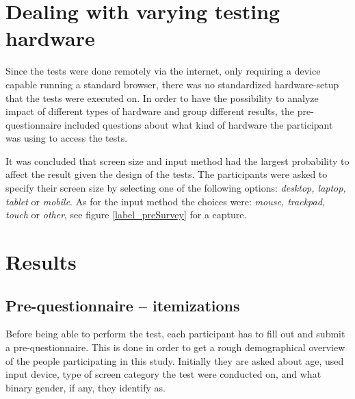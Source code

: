 
\section{Dealing with varying testing hardware}\label{label_testingHardware}

  Since the tests were done remotely via the internet, only requiring a
  device capable running a standard browser, there was no standardized
  hardware-setup that the tests were executed on. In order to have the
  possibility to analyze impact of different types of hardware and group
  different results, the pre-questionnaire included questions about what
  kind of hardware the participant was using to access the tests.

  It was concluded that screen size and input method had the largest
  probability to affect the result given the design of the tests.
  The participants were asked to specify their screen size by selecting one
  of the following options: \textit{desktop, laptop, tablet} or
  \textit{mobile}. As for the input method the choices were:
  \textit{mouse, trackpad, touch} or \textit{other}, see figure
  \ref{label_preSurvey} for a capture.


\section{Results}


  \subsection{Pre-questionnaire -- itemizations}

    Before being able to perform the test, each participant has to fill
    out and submit a pre-questionnaire. This is done in order to get
    a rough demographical overview of the people participating in this
    study. Initially they are asked about age, used input device, type of
    screen category the test were conducted on, and what binary gender, if
    any, they identify as.

